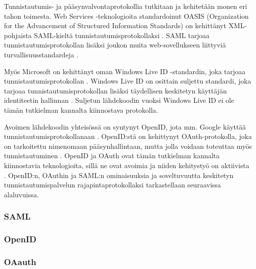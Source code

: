 Tunnistautumis- ja pääsynvalvontaprotokollia tutkitaan ja kehitetään monen eri tahon toimesta. Web Services -teknologioita standardoinut OASIS (Organization for the Advancement of Structured Information Standards) on kehittänyt XML-pohjaista SAML-kieltä tunnistautumisprotokollaksi \cite{saml_spec}. SAML tarjoaa tunnistautumisprotokollan lisäksi joukon muita web-sovellukseen liittyviä turvallisuusstandardeja \cite{next_saml}.

Myös Microsoft on kehittänyt oman Windows Live ID -standardin, joka tarjoaa tunnistautumisprotokollan \cite{open_identity}. Windows Live ID on osittain suljettu standardi, joka tarjoaa tunnistautumisprotokollan lisäksi täydellisen keskitetyn käyttäjän identiteetin hallinnan \cite{open_identity}. Suljetun lähdekoodin vuoksi Windows Live ID ei ole tämän tutkielman kannalta kiinnostava protokolla.

Avoimen lähdekoodin yhteisössä on syntynyt OpenID, jota mm. Google käyttää tunnistautumisprotokollanaan \cite{open_identity}. OpenID:stä on kehittynyt OAuth-pro\-to\-kol\-la, joka on tarkoitettu nimenomaan pääsynhallintaan, mutta jolla voidaan toteuttaa myös tunnistautuminen \cite{formal_oauth}. OpenID ja OAuth ovat tämän tutkielman kannalta kiinnostavia teknologioita, sillä ne ovat avoimia ja niiden kehitystyö on aktiivista \cite{facebook}. OpenID:n, OAuthin ja SAML:n ominaisuuksia ja soveltuvuutta keskitetyn tunnistautumispalvelun rajapintaprotokollaksi tarkastellaan seuraavissa alaluvuissa.

\subsubsection{SAML}

\subsubsection{OpenID}

\subsubsection{OAauth}
